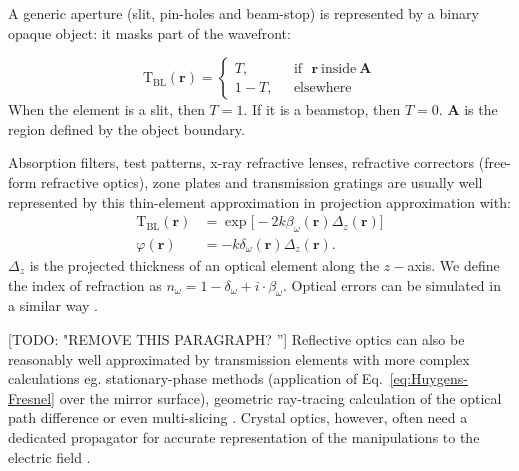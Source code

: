 \documentclass{iucr}              %
\newcommand{\todo}[1]{{\color{red}[TODO: "#1'']}}
\newcommand{\inred}[1]{{\color{red}#1}}
\begin{document}
 

A generic aperture (slit, pin-holes and beam-stop) is represented by a binary opaque object: it masks part of the wavefront:

\begin{equation}
\mathrm{T}_{\text{BL}}(\textbf{r}) =
\left\{
\begin{matrix}
T,  & \mbox{~~if~~}  \textbf{r}~\text{inside}~ \textbf{A}
\\ 
1 - T, & \mbox{~~elsewhere}
\end{matrix}
\right.
\end{equation}
When the element is a slit, then $T=1$. If it is a beamstop, then $T=0$. $\textbf{A}$ is the region defined by the object boundary. 


Absorption filters, test patterns, x-ray refractive lenses, refractive correctors (free-form refractive optics), zone plates and transmission gratings are usually well represented by this thin-element approximation in projection approximation with:
\begin{subequations}
\begin{align}   
    \mathrm{T}_{\text{BL}}(\textbf{r})&=\exp{\big[-2k\beta_\omega(\textbf{r})\Delta_z(\textbf{r})\big]}\label{eq:aux_funcs_transa}  \\
    \varphi(\textbf{r})&=-k\delta_\omega(\textbf{r})\Delta_z(\textbf{r}).\label{eq:aux_funcs_transb}
\end{align}
\end{subequations}
$\Delta_z$ is the projected thickness of an optical element along the $z-$axis. We define the index of refraction as $n_\omega=1-\delta_\omega+i\cdot\beta_\omega$. Optical errors can be simulated in a similar way \cite{Laundy2014,Celestre:mo5214,srioLBL}.

\todo{REMOVE THIS PARAGRAPH? }
\inred{Reflective optics can also be reasonably well approximated by transmission elements with more complex calculations eg. stationary-phase methods (application of Eq.~\ref{eq:Huygens-Fresnel} over the mirror surface), geometric ray-tracing calculation of the optical path difference \cite{Canestrari2014} or even multi-slicing \cite{Li2017}. Crystal optics, however, often need a dedicated propagator for accurate representation of the manipulations to the electric field \cite{Sutter2014, Sutter2020}.  }

\end{document}
